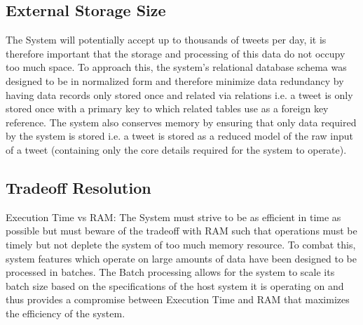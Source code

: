 \documentclass[11pt]{report}
\begin{document}
\subsection*{External Storage Size} 
The System will potentially accept up to thousands of tweets per day, it is therefore important that the storage and processing of this data do not occupy too much space. To approach this, the system's relational database schema was designed to be in normalized form and therefore minimize data redundancy by having data records only stored once and related via relations i.e. a tweet is only stored once with a primary key to which related tables use as a foreign key reference. The system also conserves memory by ensuring that only data required by the system is stored i.e. a tweet is stored as a reduced model of the raw input of a tweet (containing only the core details required for the system to operate).

\enlargethispage{\baselineskip}
\enlargethispage{\baselineskip}
\subsection*{Tradeoff Resolution} 

Execution Time vs RAM: The System must strive to be as efficient in time as possible but must beware of the tradeoff with RAM such that operations must be timely but not deplete the system of too much memory resource. To combat this, system features which operate on large amounts of data have been designed to be processed in batches. The Batch processing allows for the system to scale its batch size based on the specifications of the host system it is operating on and thus provides a compromise between Execution Time and RAM that maximizes the efficiency of the system.
\end{document}
